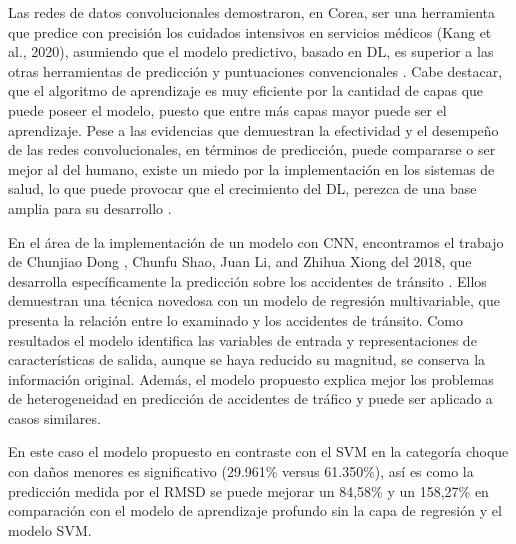 \par Las redes de datos convolucionales demostraron, en Corea, ser una herramienta que predice con precisión los cuidados intensivos en servicios médicos (Kang et al., 2020), asumiendo que el modelo predictivo, basado en DL, es superior a las otras herramientas de predicción y puntuaciones convencionales \cite{Bioetica2022}. Cabe destacar, que el algoritmo de aprendizaje es muy eficiente por la cantidad de capas que puede poseer el modelo, puesto que entre más capas mayor puede ser el aprendizaje. Pese a las evidencias que demuestran la efectividad y el desempeño de las redes convolucionales, en términos de predicción, puede compararse o ser mejor al del humano, existe un miedo por la implementación en los sistemas de salud, lo que puede provocar que el crecimiento del DL, perezca de una base amplia para su desarrollo \cite{Nagendran2020}.\\

\par En el área de la implementación de un modelo con CNN, encontramos el trabajo de Chunjiao Dong , Chunfu Shao, Juan Li, and Zhihua Xiong del 2018, que desarrolla específicamente la predicción sobre los accidentes de tránsito \cite{shao2018improved}. Ellos demuestran una técnica novedosa con un modelo de regresión multivariable, que presenta la relación entre lo examinado y los accidentes de tránsito. Como resultados el modelo identifica las variables de entrada y representaciones de características de salida, aunque se haya reducido su magnitud, se conserva la información original. Además, el modelo propuesto explica mejor los problemas de heterogeneidad en predicción de accidentes de tráfico y puede ser aplicado a casos similares.\\

\par En este caso el modelo propuesto en contraste con el SVM en la categoría choque con daños menores es significativo (29.961\% versus 61.350\%), así es como la predicción medida por el RMSD se puede mejorar un  84,58\% y un 158,27\% en comparación con el modelo de aprendizaje profundo sin la capa de regresión y el modelo SVM.\\





